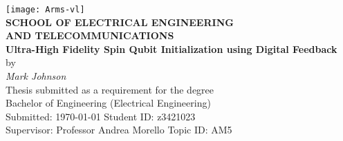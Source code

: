\begin{center}
	\centering\texttt{[image: Arms-vl]}\\
	[0.5cm]
\textbf{\large SCHOOL OF ELECTRICAL ENGINEERING\\
AND TELECOMMUNICATIONS}\\[2cm]
{\addtolength{\baselineskip}{0.5cm}
\textbf{\Huge
Ultra-High Fidelity Spin Qubit Initialization using Digital Feedback} \\[0.5cm]
}
{\Large by}\\[0.5cm]
\textit{\huge
Mark Johnson} \\[1.5cm]
{\Large
	Thesis submitted as a requirement for the degree\\
	Bachelor of Engineering (Electrical Engineering)\\[2ex]
\vfill
Submitted: \today\hfill
Student ID: z3421023\\[-1.0ex]
Supervisor: Professor Andrea Morello\hfill
Topic ID: AM5\\
\vspace*{-1cm}
}
\end{center}